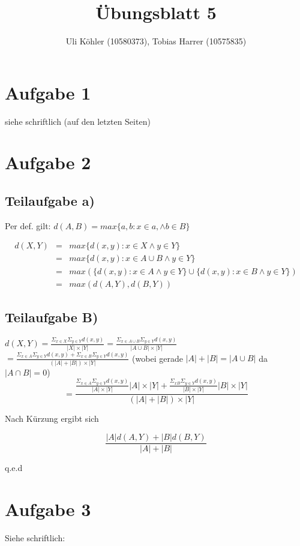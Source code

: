 \documentclass[a4paper,10pt,oneside,leqno]{scrartcl}
\title{Übungsblatt 5}
\author{Uli Köhler (10580373), Tobias Harrer (10575835)}
\begin{document}
\maketitle

\section*{Aufgabe 1}%
siehe schriftlich (auf den letzten Seiten)

\section*{Aufgabe 2}%
\subsection*{Teilaufgabe a)}
Per def. gilt: $d(A,B) = max\{a, b:x\in a, \wedge b \in B\}$

\begin{align}
 d(X,Y) &=& max\{d(x,y):x\in X \wedge y \in Y\}\\
 &=& max\{d(x,y):x\in A\cup B \wedge y \in Y\}\\
 &=& max(\{d(x,y):x\in A \wedge y \in Y\} \cup \{d(x,y):x\in B \wedge y \in Y\})\\
 &=& max(d(A,Y), d(B,Y))
\end{align}

\subsection*{Teilaufgabe B)}
$d(X,Y) = \frac{\Sigma_{x \in X}\Sigma_{y \in Y}d(x,y)}{|X|\times |Y|}
=\frac{\Sigma_{x \in A\cup B}\Sigma_{y \in Y}d(x,y)}{|A\cup B|\times |Y|}$\\
$=\frac{\Sigma_{x \in A}\Sigma_{y \in Y}d(x,y) + \Sigma_{x \in B}\Sigma_{y \in Y}d(x,y)}{(|A| + |B|)\times |Y|}$
(wobei gerade $|A| + |B| = |A \cup B|$ da $|A \cap B| = 0$)\\

\[
 =\frac{\frac{\Sigma_{x \in A}\Sigma_{y \in Y}d(x,y)}{|A|\times |Y|} |A|\times|Y| + \frac{\Sigma_{x B}\Sigma_{y \in Y}d(x,y)}{|B|\times |Y|} |B|\times|Y|}{(|A|+|B|)\times |Y|}
\]

Nach Kürzung ergibt sich

\[
 \frac{|A|d(A,Y) + |B|d(B,Y)}{|A| + |B|}
\]

q.e.d


\section*{Aufgabe 3}%
Siehe schriftlich:



\end{document}
